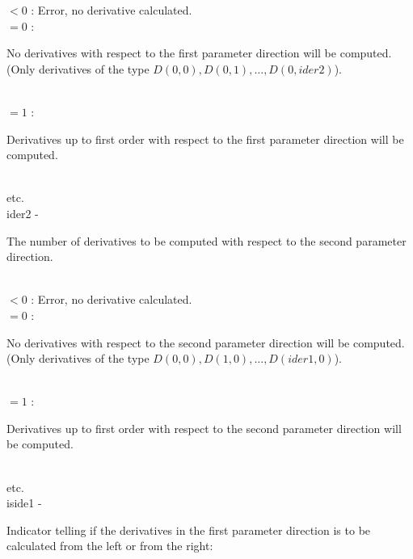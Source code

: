                      \>\>\>\> $<0$ \> \> : Error, no derivative calculated.\\
                     \>\>\>\> $=0$ \> \> :
                     \begin{minipg5}
                       No derivatives with respect to the first
                       parameter direction will be computed.
                       (Only derivatives of the type
                       $D(0,0),D(0,1),\dots,D(0,ider2)$).
                     \end{minipg5}\\[0.8ex]
                     \>\>\>\> $=1$ \> :
                     \begin{minipg5}
                       Derivatives up to first order with respect to
                       the first parameter direction will be
                       computed.
                     \end{minipg5}\\[0.8ex]
                     \>\>\>\>      \>   etc.\\
\newpagetabs
        \>\>    {\fov ider2}\> - \>  \begin{minipg2}
                     The number of derivatives to be computed with respect
                       to the second parameter direction.
        \end{minipg2}\\[0.8ex]
                     \>\>\>\> $<0$ \> \> : Error, no derivative calculated.\\
                     \>\>\>\> $=0$ \> \> :
                     \begin{minipg5}
                       No derivatives with respect to the second
                       parameter direction will be computed.
                       (Only derivatives of the type
                       $D(0,0),D(1,0),\dots,D(ider1,0)$).
                     \end{minipg5}\\[0.8ex]
                     \>\>\>\> $=1$ \> :
                     \begin{minipg5}
                       Derivatives up to first order with respect to
                       the second parameter direction will be computed.
                     \end{minipg5}\\[0.8ex]
                     \>\>\>\>      \>   etc.\\
        \>\>    {\fov iside1}\> - \>
        \begin{minipg2}
          Indicator telling if the derivatives in the first
          parameter direction is to be calculated from the
          left or from the right:
        \end{minipg2}\\[0.3ex]
